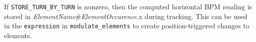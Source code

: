 If \verb|STORE_TURN_BY_TURN| is nonzero, then the computed horizontal BPM reading is stored in
{\em ElementName}\#{\em ElementOccurence}.x during tracking.
This can be used in the \verb|expression| in \verb|modulate_elements| to create position-triggered
changes to elements.
